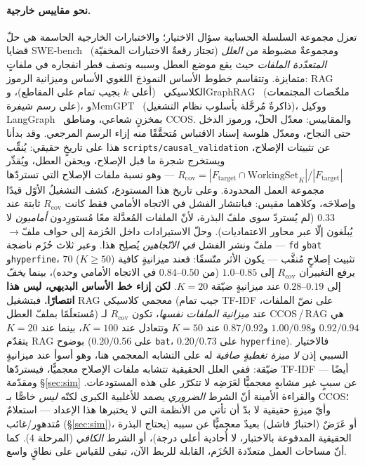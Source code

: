 \documentclass[11pt]{article}
\newcommand{\code}[1]{\textenglish{\texttt{#1}}}
\begin{document}
\paragraph{نحو مقاييس خارجية.} تعزل مجموعة السلسلة الحسابية سؤال الاختيار؛ والاختبارات
الخارجية الحاسمة هي حلّ قضايا SWE-bench~\cite{jimenez2023swebench} (تجتاز رقعةٌ الاختبارات
المخفيّة) ومجموعةٌ مضبوطة من \emph{العلل المتعدّدة الملفات} حيث يقع موضع العطل وسببه ونصف
قطر انفجاره في ملفاتٍ متمايزة. وتتقاسم خطوط الأساس النموذجَ اللغوي الأساس وميزانية الرموز:
RAG الكلاسيكي~\cite{lewis2020rag} (أعلى $k$ بجيب تمام على المقاطع)، وGraphRAG~\cite{edge2024graphrag}
(ملخّصات المجتمعات على رسم شيفرة)، وMemGPT~\cite{packer2023memgpt} (ذاكرةٌ مُرحَّلة بأسلوب
نظام التشغيل)، ووكيل LangGraph~\cite{langgraph} بمخزنٍ شعاعي، ومناطق CCOS. والمقاييس: معدّل
الحلّ، ورموز الدخل حتى النجاح، ومعدّل هلوسة إسناد الاقتباس مُتحقَّقًا منه إزاء الرسم المرجعي.
وقد بدأنا هذا على تاريخٍ حقيقي: يُنقِّب \code{scripts/causal\_validation} عن تثبيتات الإصلاح،
ويستخرج شجرة ما قبل الإصلاح، ويحقن العطل، ويُقدِّر
$R_{\mathrm{cov}} = |F_{\mathrm{target}} \cap \mathrm{WorkingSet}_K| / |F_{\mathrm{target}}|$
--- وهو نسبة ملفات الإصلاح التي تستردّها مجموعة العمل المحدودة. وعلى تاريخ هذا المستودع، كشف
التشغيلُ الأوّل قيدًا وإصلاحَه، وكلاهما مقيس: فبانتشار الفشل في الاتجاه الأمامي فقط كانت
$R_{\mathrm{cov}}$ ثابتة عند $0.33$ (لم يُستردّ سوى ملفّ البذرة، لأنّ الملفات المُعدَّلة معًا
مُستورِدون \emph{أماميون} لا يُبلَغون إلّا عبر محاور الاعتماديات). وحلّ الاستيرادات داخل
الحُزمة إلى حواف ملفّ$\to$ملفّ ونشر الفشل \emph{في الاتّجاهين} يُصلِح هذا. وعبر ثلاث حُزَم
ناضجة --- \code{fd} و\code{bat} و\code{hyperfine}، $70$ تثبيت إصلاحٍ مُنقَّب --- يكون الأثر
متّسقًا: فعند ميزانيةٍ كافية ($K{\ge}50$) يرفع التغييران $R_{\mathrm{cov}}$ إلى $0.85$--$1.0$
(من $0.50$--$0.84$ في الاتجاه الأمامي وحده)، بينما \emph{يخفّ} إلى $0.19$--$0.28$ عند ميزانيةٍ
ضيّقة $K{=}20$. \textbf{لكن إزاء خط الأساس البديهي، ليس هذا انتصارًا.} فبتشغيل RAG معجمي
كلاسيكي (جيب تمام TF-IDF على نصّ الملفات، مُستعلَمًا بملفّ العطل) عند \emph{ميزانية الملفات
نفسها}، تكون $R_{\mathrm{cov}}$ لـ CCOS\,/\,RAG هي $0.92/0.94$ و$1.00/0.98$ و$0.87/0.92$ عند
$K{=}50$ وتتعادل عند $K{=}100$، بينما عند $K{=}20$ يتقدّم RAG بوضوح ($0.20/0.56$ على
\code{bat}، $0.20/0.73$ على \code{hyperfine}). فالاختيار السببي إذن \emph{لا ميزة تغطيةٍ
صافية} له على التشابه المعجمي هنا، وهو أسوأ عند ميزانيةٍ ضيّقة: ففي العلل الحقيقية تتشابه
ملفات الإصلاح معجميًّا، فيستردّها TF-IDF أيضًا --- ومقدّمة \S\ref{sec:sim} عن سببٍ غير مشابهٍ
معجميًّا لعَرَضِه لا تتكرّر على هذه المستودعات. والقراءة الأمينة أنّ الشرط \emph{الضروري}
يصمد للأغلبية الكبرى لكنّه \emph{ليس} خاصًّا بـ CCOS؛ وأيّ ميزةٍ حقيقية لا بدّ أن تأتي من
الأنظمة التي لا يختبرها هذا الإعداد --- استعلامٌ مُتدهوِر/غائب (\S\ref{sec:sim})، أو عَرَضٌ
(اختبارٌ فاشل) بعيدٌ معجميًّا عن سببه (يحتاج البذرة الحقيقية المدفوعة بالاختبار، لا أُحادية
أعلى درجة)، أو الشرط \emph{الكافي} (المرحلة 4). كما أنّ مساحات العمل متعدّدة الحُزَم، القابلة
للربط الآن، تبقى للقياس على نطاقٍ واسع.
\end{document}
